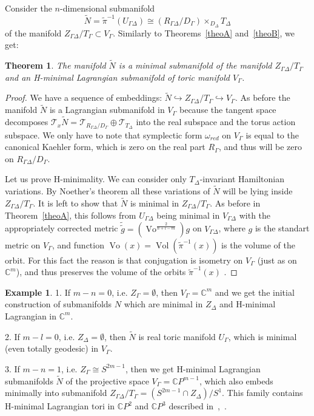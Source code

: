 \documentclass[jsg]{IP_v1_forauthors}
\def\Vo{\mathop{\mathrm{Vo}}}
\def\Vol{\mathop{\mathrm{Vol}}}
\newtheorem{theo}{Theorem}[section]
\theoremstyle{definition}
\numberwithin{equation}{section}
\newtheorem{exam}{Example}
\begin{document}
Consider the $n$-dimensional submanifold 
\begin{equation}
\tilde{N} = \tilde{\pi} ^{-1}(U_{\Gamma \Delta}) \cong (R_{\Gamma \Delta}/D_\Gamma) \times_{D_\Delta} T_\Delta
\end{equation} 
of the manifold $ Z_{\Gamma \Delta}/T_\Gamma  \subset V_\Gamma $. Similarly to Theorems~\ref{theoA} and~\ref{theoB}, we get:
\begin{theo}
The manifold $\tilde{N}$ is a minimal submanifold of the manifold $ Z_{\Gamma \Delta}/T_\Gamma $ and an H-minimal Lagrangian submanifold of toric manifold $V_\Gamma$.
\end{theo}
\begin{proof}
We have a sequence of embeddings: $ \tilde{N} \hookrightarrow Z_{\Gamma \Delta} / T_\Gamma \hookrightarrow V_\Gamma$. As before the manifold $\tilde{N}$ is a Lagrangian submanifold in $V_\Gamma$ because the tangent space decomposes $\mathcal T_x \tilde{N}=\mathcal T_{R_{\Gamma \Delta}/ D_\Gamma} \oplus \mathcal T_{T_\Delta}$ into the real subspace and the torus action subspace. We only have to note that symplectic form $\omega_{red}$ on $V_\Gamma$ is equal to the canonical Kaehler form, which is zero on the real part $R_\Gamma$, and thus will be zero on $R_{\Gamma \Delta}/D_\Gamma$.

Let us prove H-minimality. We can consider only $T_\Delta$-invariant Hamiltonian variations. By Noether's theorem all these variations of $\tilde{N}$ will be lying inside $Z_{\Gamma \Delta} / T_\Gamma$. It is left to show that $\tilde{N}$ is minimal in $Z_{\Gamma \Delta} / T_\Gamma$. As before in Theorem~\ref{theoA}, this follows from $U_{\Gamma \Delta}$ being minimal in $V_{\Gamma \Delta}$ with the appropriately corrected metric $\tilde{ \tilde{g}} =( \Vo ^{ \frac {2} {n+l-m}} )g$ on $V_{\Gamma \Delta}$, where $g$ is the standart metric on $V_\Gamma$, and function $\Vo(x)=\Vol(\tilde{\pi}^{-1}(x) )$ is the volume of the orbit. For this fact the reason is that conjugation is isometry on $V_\Gamma$ (just as on $\mathbb{C}^m$), and thus preserves the volume of the orbits $\tilde{\pi}^{-1}(x)$ . 
\end{proof}
\begin{exam}

1. If $m-n=0$, i.e. $Z_\Gamma=\emptyset$, then $V_\Gamma={\mathbb C}^m$ and we get the initial construction of submanifolds $N$ which are minimal in $Z_\Delta$ and H-minimal Lagrangian in ${\mathbb C}^m$.

2. If $m-l=0$, i.e. $Z_\Delta=\emptyset$, then $\tilde{N}$ is real toric manifold $U_\Gamma$, which is minimal (even totally geodesic) in $V_\Gamma$.

3. If $m-n=1$, i.e. $Z_\Gamma \cong S^{2m-1}$, then we get H-minimal Lagrangian submanifolds $\tilde{N}$ of the projective space $V_\Gamma={\mathbb C}P^{m-1}$, which also embeds minimally into submanifold $Z_{\Gamma \Delta} / T_\Gamma = (S^{2m-1} \cap Z_\Delta )/ S^1$. This family contains H-minimal Lagrangian tori in $\mathbb{C}P^2$ and $\mathbb{C}P^3$ described in~\cite{Mi1},~\cite{MZ}.
\end{exam}
\end{document}
